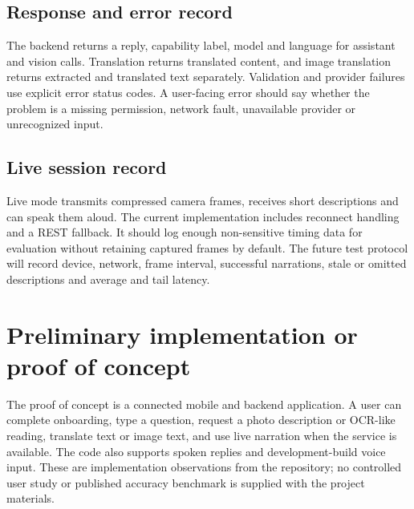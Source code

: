 \documentclass[12pt,a4paper,oneside]{report}
\begin{document}
\subsection{Response and error record}
The backend returns a reply, capability label, model and language for assistant and vision calls. Translation returns translated content, and image translation returns extracted and translated text separately. Validation and provider failures use explicit error status codes. A user-facing error should say whether the problem is a missing permission, network fault, unavailable provider or unrecognized input.

\subsection{Live session record}
Live mode transmits compressed camera frames, receives short descriptions and can speak them aloud. The current implementation includes reconnect handling and a REST fallback. It should log enough non-sensitive timing data for evaluation without retaining captured frames by default. The future test protocol will record device, network, frame interval, successful narrations, stale or omitted descriptions and average and tail latency.

\section{Preliminary implementation or proof of concept}
The proof of concept is a connected mobile and backend application. A user can complete onboarding, type a question, request a photo description or OCR-like reading, translate text or image text, and use live narration when the service is available. The code also supports spoken replies and development-build voice input. These are implementation observations from the repository; no controlled user study or published accuracy benchmark is supplied with the project materials.
\end{document}
